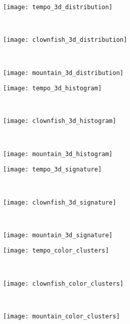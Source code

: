\begin{figure}[!ht]
    \begin{subfigure}[t]{\textwidth+20pt\relax}
    	\texttt{[image: tempo\_3d\_distribution]}
    \end{subfigure}~ 
    \begin{subfigure}[b]{0.32\textwidth}
        \texttt{[image: clownfish\_3d\_distribution]}
    \end{subfigure}~
    \begin{subfigure}[b]{0.32\textwidth}
        \texttt{[image: mountain\_3d\_distribution]}
    \end{subfigure}%
      
    \begin{subfigure}[t]{\textwidth+20pt\relax}
    	\texttt{[image: tempo\_3d\_histogram]}
    \end{subfigure}~ 
    \begin{subfigure}[b]{0.32\textwidth}
        \texttt{[image: clownfish\_3d\_histogram]}
    \end{subfigure}~
    \begin{subfigure}[b]{0.32\textwidth}
        \texttt{[image: mountain\_3d\_histogram]}
    \end{subfigure}%
      
    \begin{subfigure}[t]{\textwidth+20pt\relax}
    	\texttt{[image: tempo\_3d\_signature]}
    \end{subfigure}~ 
    \begin{subfigure}[b]{0.32\textwidth}
        \texttt{[image: clownfish\_3d\_signature]}
    \end{subfigure}~
    \begin{subfigure}[b]{0.32\textwidth}
        \texttt{[image: mountain\_3d\_signature]}
    \end{subfigure}\vspace{2pt}    
    
    \begin{subfigure}[t]{\textwidth+20pt\relax}
    	\texttt{[image: tempo\_color\_clusters]}
    \end{subfigure}~ 
    \begin{subfigure}[b]{0.32\textwidth}
        \texttt{[image: clownfish\_color\_clusters]}
    \end{subfigure}~
    \begin{subfigure}[b]{0.32\textwidth}
        \texttt{[image: mountain\_color\_clusters]}
    \end{subfigure}\vspace{-10pt}   
     

\end{figure}
